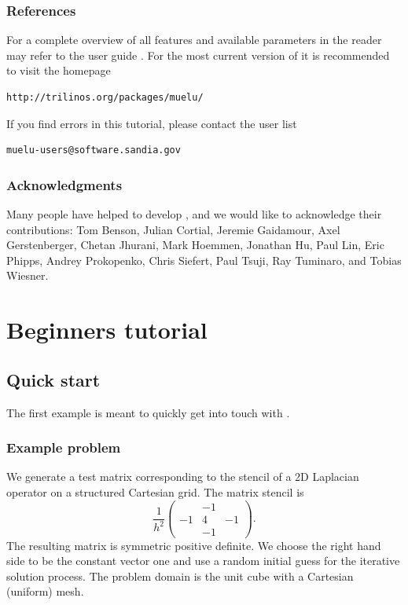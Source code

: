 \documentclass[10pt,fleqn]{book}
\begin{document}
\section*{References}

For a complete overview of all features and available parameters in \muelu the reader may refer to the \muelu user guide \cite{Mue}. For the most current version of \muelu it is recommended to visit the homepage
\begin{verbatim}
http://trilinos.org/packages/muelu/
\end{verbatim}
If you find errors in this tutorial, please contact the \muelu user list
\begin{verbatim}
muelu-users@software.sandia.gov
\end{verbatim}

\section*{Acknowledgments}
Many people have helped to develop \muelu, and we would like to acknowledge their contributions: Tom Benson, Julian Cortial, Jeremie Gaidamour, Axel Gerstenberger, Chetan Jhurani, Mark Hoemmen, Jonathan Hu, Paul Lin, Eric Phipps, Andrey Prokopenko, Chris Siefert, Paul Tsuji, Ray Tuminaro, and Tobias Wiesner.

\part{Beginners tutorial}

\lstset{
  breaklines=true,                %
}



\chapter{Quick start}

The first example is meant to quickly get into touch with \muelu.

\section{Example problem}
\label{lab:examplesym}
We generate a test matrix corresponding to the stencil of a 2D Laplacian operator on a structured Cartesian grid. The matrix stencil is
\begin{equation}
\label{lab:eq1}
\frac{1}{h^2}\begin{pmatrix} & -1 & \\ -1 & 4 & -1 \\ & -1 & \end{pmatrix}.
\end{equation}
The resulting matrix is symmetric positive definite. We choose the right hand side to be the constant vector one and use a random initial guess for the iterative solution process. The problem domain is the unit cube with a Cartesian (uniform) mesh.
\end{document}
